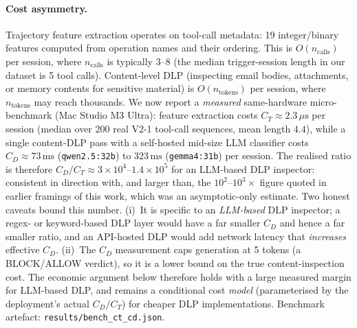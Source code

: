 \documentclass{article}
\begin{document}
\paragraph{Cost asymmetry.} Trajectory feature extraction operates on tool-call metadata: 19 integer/binary features computed from operation names and their ordering. This is $O(n_{\text{calls}})$ per session, where $n_{\text{calls}}$ is typically $3$--$8$ (the median trigger-session length in our dataset is 5 tool calls). Content-level DLP (inspecting email bodies, attachments, or memory contents for sensitive material) is $O(n_{\text{tokens}})$ per session, where $n_{\text{tokens}}$ may reach thousands. We now report a \emph{measured} same-hardware micro-benchmark (Mac Studio M3 Ultra): feature extraction costs $C_T \approx 2.3\,\mu\text{s}$ per session (median over 200 real V2-1 tool-call sequences, mean length $4.4$), while a single content-DLP pass with a self-hosted mid-size LLM classifier costs $C_D \approx 73\,\text{ms}$ (\texttt{qwen2.5:32b}) to $323\,\text{ms}$ (\texttt{gemma4:31b}) per session. The realised ratio is therefore $C_D/C_T \approx 3\times10^{4}$--$1.4\times10^{5}$ for an LLM-based DLP inspector: consistent in direction with, and larger than, the $10^2$--$10^3\times$ figure quoted in earlier framings of this work, which was an asymptotic-only estimate. Two honest caveats bound this number. (i)~It is specific to an \emph{LLM-based} DLP inspector; a regex- or keyword-based DLP layer would have a far smaller $C_D$ and hence a far smaller ratio, and an API-hosted DLP would add network latency that \emph{increases} effective $C_D$. (ii)~The $C_D$ measurement caps generation at 5 tokens (a BLOCK/ALLOW verdict), so it is a lower bound on the true content-inspection cost. The economic argument below therefore holds with a large measured margin for LLM-based DLP, and remains a conditional cost \emph{model} (parameterised by the deployment's actual $C_D/C_T$) for cheaper DLP implementations. Benchmark artefact: \texttt{results/bench\_ct\_cd.json}.
\end{document}
